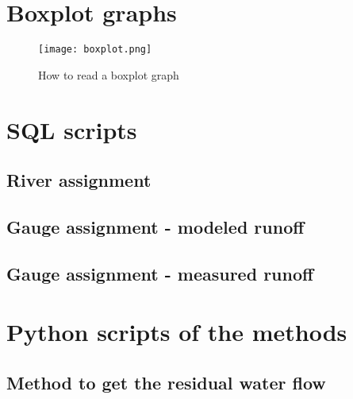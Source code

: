 \appendix
\chapter{Boxplot graphs}
\label{app:boxplot}

\begin{figure}[H]
\centering
\texttt{[image: boxplot.png]}
\caption[How to read a boxplot graph]{How to read a boxplot graph \cite{stk_boxplot}}
\label{boxlot}
\end{figure}

\chapter{SQL scripts}
\section{River assignment}
\label{app:sql_assign_river}




\section{Gauge assignment - modeled runoff}
\label{app:sql_assign_watergap}




\section{Gauge assignment - measured runoff}
\label{app:sql_assign_gauge}



\chapter{Python scripts of the methods}
\section{Method to get the residual water flow}
\label{app:get_dV_rest}



